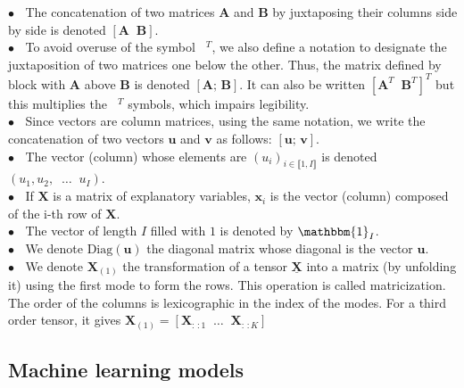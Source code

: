 \documentclass[preprint,12pt]{elsarticle}
\begin{document}
\noindent $\bullet \; \;$ The concatenation of two matrices $\mathbf{A}$ and $\mathbf{B}$ by juxtaposing their columns side by side is denoted $[\mathbf{A} \; \; \mathbf{B}]$.\\
$\bullet \; \;$ To avoid overuse of the symbol $\phantom{a}^T$, we also define a notation to designate the juxtaposition of two matrices one below the other. Thus, the matrix defined by block with $\mathbf{A}$ above $\mathbf{B}$ is denoted $\left[\mathbf{A}; \, \mathbf{B}\right]$. It can also be written $[\mathbf{A}^T \; \; \mathbf{B}^T]^T$ but this multiplies the $\phantom{a}^T$ symbols, which impairs legibility. \\
$\bullet \; \;$ Since vectors are column matrices, using the same notation, we write the concatenation of two vectors $\mathbf{u}$ and $\mathbf{v}$ as follows: $[\mathbf{u}; \, \mathbf{v}]$.  \\
$\bullet \; \;$ The vector (column) whose elements are $(u_i)_{i \in \llbracket 1, I\rrbracket}$ is denoted $(u_1, u_2, \; \; \hdots \;\; u_I)$. \\
$\bullet \; \;$ If $\mathbf{X}$ is a matrix of explanatory variables, $\mathbf{x}_i$ is the vector (column) composed of the i-th row of $\mathbf{X}$.\\
$\bullet \; \;$ The vector of length $I$ filled with $1$ is denoted by $\mathbbm{1}_I$.\\
$\bullet \; \;$ We denote $\text{Diag}(\mathbf{u})$ the diagonal matrix whose diagonal is the vector $\mathbf{u}$. \\
$\bullet \; \;$ We denote $\mathbf{X}_{(1)}$ the transformation of a tensor $\underline{\mathbf{X}}$ into a matrix (by unfolding it) using the first mode to form the rows. This operation is called matricization. The order of the columns is lexicographic in the index of the modes. For a third order tensor, it gives $\mathbf{X}_{(1)} = [\mathbf{X}_{:\,:1} \; \; \ldots \; \;\mathbf{X}_{:\,:K}]$ 




\subsection{Machine learning models}
\label{sec:models}
\end{document}
